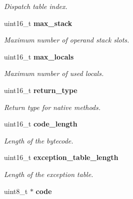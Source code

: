 \begin{DoxyCompactItemize}
\begin{DoxyCompactList}\small\item\em Dispatch table index. \item\end{DoxyCompactList}\item 
uint16\_\-t {\bf max\_\-stack}\label{structmethod__t_aca2dc85191bbdb09a212c9693527d319}

\begin{DoxyCompactList}\small\item\em Maximum number of operand stack slots. \item\end{DoxyCompactList}\item 
uint16\_\-t {\bf max\_\-locals}\label{structmethod__t_adeeae7fcf3a26e43df89d2da4a57a9ac}

\begin{DoxyCompactList}\small\item\em Maximum number of used locals. \item\end{DoxyCompactList}\item 
uint16\_\-t {\bf return\_\-type}\label{structmethod__t_a63391b4ff4198123be2064e039cbb6ba}

\begin{DoxyCompactList}\small\item\em Return type for native methods. \item\end{DoxyCompactList}\item 
uint16\_\-t {\bf code\_\-length}\label{structmethod__t_a1c31f95bb299ef65e96505b638310386}

\begin{DoxyCompactList}\small\item\em Length of the bytecode. \item\end{DoxyCompactList}\item 
uint16\_\-t {\bf exception\_\-table\_\-length}\label{structmethod__t_a7edaffe83fb0948d93dc36e1cd3be894}

\begin{DoxyCompactList}\small\item\em Length of the exception table. \item\end{DoxyCompactList}\item 
uint8\_\-t $\ast$ {\bf code}\label{structmethod__t_a31941bf0c178f48eb8da065d36a57853}


\end{DoxyCompactItemize}
